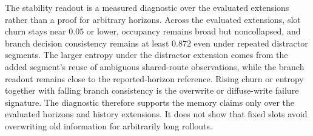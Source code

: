 \documentclass{article}
\begin{document}
\begin{table}[H]
    \centering
    \caption{Long-horizon memory stability diagnostics for fixed slot TRACE memory. Values are task-balanced means over held-out rollouts. Readout and decision consistency compare each extension with the matched reported-horizon branch readout.}
    \label{tab:long_horizon_stability}
    \setlength{\tabcolsep}{3.0pt}
    \renewcommand{\arraystretch}{1.05}
\end{table}

The stability readout is a measured diagnostic over the evaluated extensions rather than a proof for arbitrary horizons. Across the evaluated extensions, slot churn stays near $0.05$ or lower, occupancy remains broad but noncollapsed, and branch decision consistency remains at least $0.872$ even under repeated distractor segments. The larger entropy under the distractor extension comes from the added segment's reuse of ambiguous shared-route observations, while the branch readout remains close to the reported-horizon reference. Rising churn or entropy together with falling branch consistency is the overwrite or diffuse-write failure signature. The diagnostic therefore supports the memory claims only over the evaluated horizons and history extensions. It does not show that fixed slots avoid overwriting old information for arbitrarily long rollouts.
\end{document}
